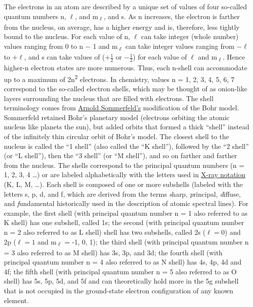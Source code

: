 The electrons in an atom are described by a unique set of values of four
so-called quantum numbers n, $\ell$, and m\textsubscript{$\ell$}, and s. As n
increases, the electron is farther from the nucleus, on average, has a
higher energy and is, therefore, less tightly bound to the nucleus. For
each value of n, $\ell$ can take integer (whole number) values ranging from 0
to n − 1 and m\textsubscript{$\ell$} can take integer values ranging from $-\ell$
to $+\ell$, and s can take values of
($+\frac{1}{2}$ or
$-\frac{1}{2}$) for each value of $\ell$ and m\textsubscript{$\ell$}. Hence higher-n electron
states are more numerous. Thus, each n-shell can accommodate up to a
maximum of 2n\textsuperscript{2} electrons. In chemistry, values n = 1,
2, 3, 4, 5, 6, 7 correspond to the so-called electron shells, which may
be thought of as onion-like layers surrounding the nucleus that are
filled with electrons. The shell terminology comes from
\href{https://en.wikipedia.org/wiki/Arnold_Sommerfeld}{Arnold
Sommerfeld's} modification of the Bohr model. Sommerfeld retained Bohr's
planetary model (electrons orbiting the atomic nucleus like planets the
sun), but added orbits that formed a thick ``shell'' instead of the
infinitely thin circular orbit of Bohr's model. The closest shell to the
nucleus is called the ``1 shell'' (also called the ``K shell''),
followed by the ``2 shell'' (or ``L shell''), then the ``3 shell'' (or
``M shell''), and so on farther and farther from the nucleus. The shells
correspond to the principal quantum numbers (n = 1, 2, 3, 4 \ldots) or
are labeled alphabetically with the letters used in
\href{https://en.wikipedia.org/wiki/x-ray_notation}{X-ray notation} (K,
L, M, \ldots). Each shell is composed of one or more subshells (labeled
with the letters s, p, d, and f, which are derived from the terms
\emph{s}harp, \emph{p}rincipal, \emph{d}iffuse, and \emph{f}undamental
historically used in the description of atomic spectral lines). For
example, the first shell (with principal quantum number n = 1 also
referred to as K shell) has one subshell, called 1s; the second (with
principal quantum number n = 2 also referred to as L shell) shell has
two subshells, called 2s ($\ell = 0$) and 2p ($\ell = 1$ and m\textsubscript{$\ell$} =
-1, 0, 1); the third shell (with principal quantum number n = 3 also
referred to as M shell) has 3s, 3p, and 3d; the fourth shell (with
principal quantum number n = 4 also referred to as N shell) has 4s, 4p,
4d and 4f; the fifth shell (with principal quantum number n = 5 also
referred to as O shell) has 5s, 5p, 5d, and 5f and can theoretically
hold more in the 5g subshell that is not occupied in the ground-state
electron configuration of any known element.

